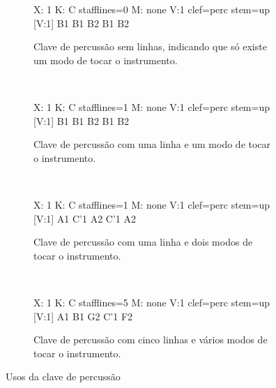 \begin{figure}[h]
    \centering 
\begin{subfigure}[c]{0.24\textwidth}
\begin{abc}[name=abc-clavepercusion1]
%
X: 1 %
K: C stafflines=0 %
M: none %
V:1 clef=perc stem=up %
%
[V:1] B1 B1 B2 B1 B2   
\end{abc}
\caption{Clave de percussão sem linhas, indicando que só existe um modo de tocar o instrumento.}
\label{fig:abc-claveperczero}
\end{subfigure}
~%
\begin{subfigure}[c]{0.24\textwidth}
\begin{abc}[name=abc-clavepercusion2a]
%
X: 1 %
K: C stafflines=1 %
M: none %
V:1 clef=perc stem=up %
%
[V:1] B1 B1 B2 B1 B2   
\end{abc}
\caption{Clave de percussão com uma linha e um modo de tocar o instrumento.}
\label{fig:abc-clavepercuma}
\end{subfigure}
~%
\begin{subfigure}[c]{0.24\textwidth}
\begin{abc}[name=abc-clavepercusion2]
%
X: 1 %
K: C stafflines=1 %
M: none %
V:1 clef=perc stem=up %
%
[V:1] A1 C'1 A2 C'1 A2   
\end{abc}
\caption{Clave de percussão com uma linha e dois modos de tocar o instrumento.}
\label{fig:abc-clavepercum2}
\end{subfigure}
~%
\begin{subfigure}[c]{0.24\textwidth}
\begin{abc}[name=abc-clavepercusion3]
%
X: 1 %
K: C stafflines=5 %
M: none %
V:1 clef=perc stem=up %
%
[V:1] A1 B1 G2 C'1 F2   
\end{abc}
\caption{Clave de percussão com cinco linhas e vários modos de tocar o instrumento.}
\label{fig:abc-claveperccinco}
\end{subfigure}
    \caption{Usos da clave de percussão}\label{fig:allpercusionclaves}
\end{figure}


